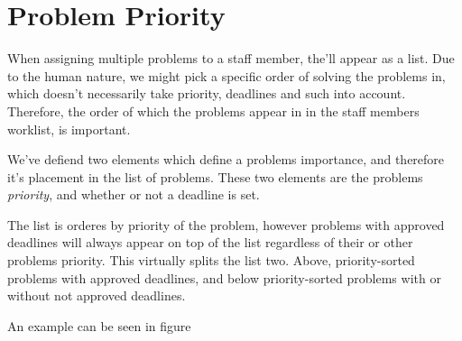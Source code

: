 \section{Problem Priority}
\label{sec:problem_priority}

When assigning multiple problems to a staff member, the'll appear as a list. Due to the human nature, we might pick a specific order of solving the problems in, which doesn't necessarily take priority, deadlines and such into account. Therefore, the order of which the problems appear in in the staff members worklist, is important.

We've defiend two elements which define a problems importance, and therefore it's placement in the list of problems. These two elements are the problems \textit{priority}, and whether or not a deadline is set.

The list is orderes by priority of the problem, however problems with approved deadlines will always appear on top of the list regardless of their or other problems priority. This virtually splits the list two. Above, priority-sorted problems with approved deadlines, and below priority-sorted problems with or without not approved deadlines.

An example can be seen in figure 